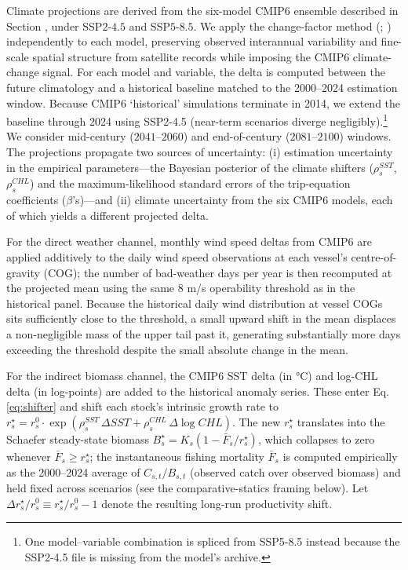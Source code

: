 \documentclass[
  11pt,
]{article}
\begin{document}
Climate projections are derived from the six-model CMIP6 ensemble described in Section \emph{}, under SSP\(2\)-\(4.5\) and SSP\(5\)-\(8.5\). We apply the change-factor method (; ) independently to each model, preserving observed interannual variability and fine-scale spatial structure from satellite records while imposing the CMIP6 climate-change signal. For each model and variable, the delta is computed between the future climatology and a historical baseline matched to the 2000--2024 estimation window. Because CMIP6 `historical' simulations terminate in 2014, we extend the baseline through 2024 using SSP2-4.5 (near-term scenarios diverge negligibly).\footnote{One model--variable combination is spliced from SSP5-8.5 instead because the SSP2-4.5 file is missing from the model's archive.} We consider mid-century (\(2041\)--\(2060\)) and end-of-century (\(2081\)--\(2100\)) windows. The projections propagate two sources of uncertainty: (i) estimation uncertainty in the empirical parameters---the Bayesian posterior of the climate shifters (\(\rho_s^{SST}\), \(\rho_s^{CHL}\)) and the maximum-likelihood standard errors of the trip-equation coefficients (\(\beta\)'s)---and (ii) climate uncertainty from the six CMIP6 models, each of which yields a different projected delta.

For the direct weather channel, monthly wind speed deltas from CMIP6 are applied additively to the daily wind speed observations at each vessel's centre-of-gravity (COG); the number of bad-weather days per year is then recomputed at the projected mean using the same \(8\) m/s operability threshold as in the historical panel. Because the historical daily wind distribution at vessel COGs sits sufficiently close to the threshold, a small upward shift in the mean displaces a non-negligible mass of the upper tail past it, generating substantially more days exceeding the threshold despite the small absolute change in the mean.

For the indirect biomass channel, the CMIP6 SST delta (in °C) and log-CHL delta (in log-points) are added to the historical anomaly series. These enter Eq. \eqref{eq:shifter} and shift each stock's intrinsic growth rate to \(r_s^{\star} = r_s^{0} \cdot \exp(\rho_s^{SST}\, \Delta SST + \rho_s^{CHL}\, \Delta \log CHL)\). The new \(r_s^{\star}\) translates into the Schaefer steady-state biomass \(B_s^{\star} = K_s(1 - \bar{F}_s/r_s^{\star})\), which collapses to zero whenever \(\bar{F}_s \geq r_s^{\star}\); the instantaneous fishing mortality \(\bar{F}_s\) is computed empirically as the 2000--2024 average of \(C_{s,t}/B_{s,t}\) (observed catch over observed biomass) and held fixed across scenarios (see the comparative-statics framing below). Let \(\Delta r_s^{\star}/r_s^{0} \equiv r_s^{\star}/r_s^{0} - 1\) denote the resulting long-run productivity shift.
\end{document}
